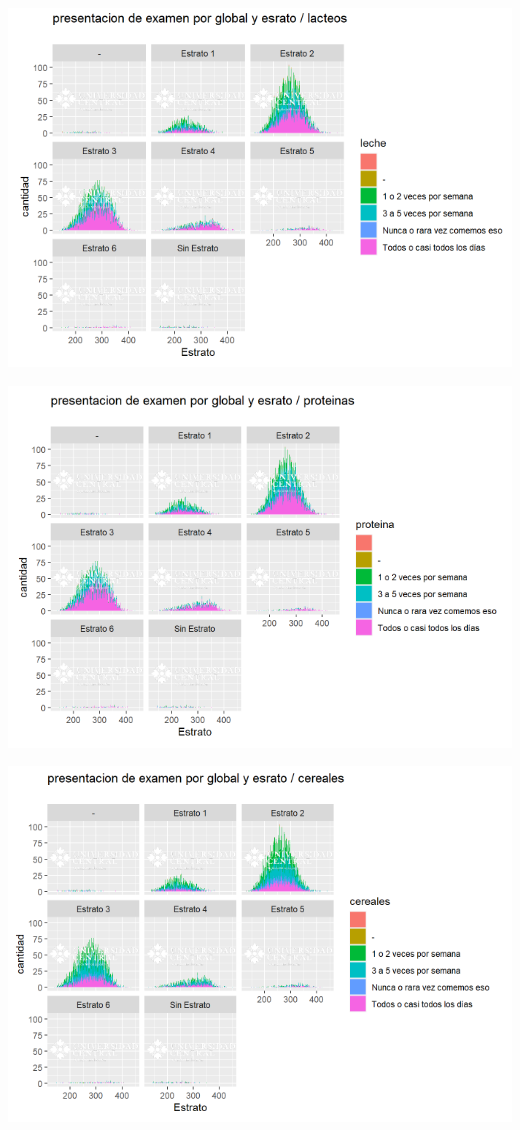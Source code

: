 \documentclass{article}
\begin{document}
\begin{center}
\includegraphics[scale=0.6]{Captura20.PNG} 
\end{center}
\begin{center}
\includegraphics[scale=0.6]{Captura21.PNG} 
\end{center}
\begin{center}
\includegraphics[scale=0.6]{Captura22.PNG} 
\end{center}
\end{document}
